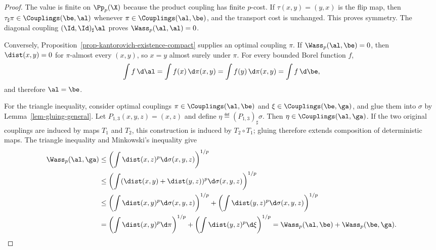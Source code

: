 \begin{proof}
	The value is finite on $\Pp_p(\X)$ because the product coupling has finite $p$-cost. If $\tau(x,y)=(y,x)$ is the flip map, then $\tau_\sharp\pi\in\Couplings(\be,\al)$ whenever $\pi\in\Couplings(\al,\be)$, and the transport cost is unchanged. This proves symmetry. The diagonal coupling $(\Id,\Id)_\sharp\al$ proves $\Wass_p(\al,\al)=0$.

	Conversely, Proposition~\ref{prop-kantorovich-existence-compact} supplies an optimal coupling $\pi$. If $\Wass_p(\al,\be)=0$, then $\dist(x,y)=0$ for $\pi$-almost every $(x,y)$, so $x=y$ almost surely under $\pi$. For every bounded Borel function $f$,
	\[
		\int f\,\d\al
		=
		\int f(x)\,\d\pi(x,y)
		=
		\int f(y)\,\d\pi(x,y)
		=
		\int f\,\d\be,
	\]
	and therefore $\al=\be$.

	For the triangle inequality, consider optimal couplings $\pi\in\Couplings(\al,\be)$ and $\xi\in\Couplings(\be,\ga)$,
	and glue them into $\sigma$ by Lemma~\ref{lem-gluing-general}. Let $P_{1,3}(x,y,z)=(x,z)$ and define $\eta\eqdef(P_{1,3})_\sharp\sigma$. Then $\eta\in\Couplings(\al,\ga)$. If the two original couplings are induced by maps $T_1$ and $T_2$, this construction is induced by $T_2\circ T_1$; gluing therefore extends composition of deterministic maps.
	The triangle inequality and Minkowski's inequality give
	\[
	\begin{aligned}
		\Wass_p(\al,\ga)
		&\leq\left(\int\dist(x,z)^p\d\sigma(x,y,z)\right)^{1/p}\\
		&\leq\left(\int(\dist(x,y)+\dist(y,z))^p\d\sigma(x,y,z)\right)^{1/p}\\
		&\leq\left(\int\dist(x,y)^p\d\sigma(x,y,z)\right)^{1/p}
		+\left(\int\dist(y,z)^p\d\sigma(x,y,z)\right)^{1/p}\\
		&=\left(\int\dist(x,y)^p\d\pi\right)^{1/p}
		+\left(\int\dist(y,z)^p\d\xi\right)^{1/p}
		=\Wass_p(\al,\be)+\Wass_p(\be,\ga).
	\end{aligned}
	\]
\end{proof}

